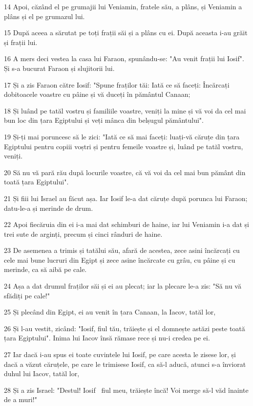 \par 14 Apoi, căzând el pe grumajii lui Veniamin, fratele său, a plâns, și Veniamin a plâns și el pe grumazul lui.
\par 15 După aceea a sărutat pe toți frații săi și a plâns cu ei. După aceasta i-au grăit și frații lui.
\par 16 A mers deci vestea la casa lui Faraon, spunându-se: "Au venit frații lui Iosif". Și s-a bucurat Faraon și slujitorii lui.
\par 17 Și a zis Faraon către Iosif: "Spune fraților tăi: Iată ce să faceți: Încărcați dobitoacele voastre cu pâine și vă duceți în pământul Canaan;
\par 18 Și luând pe tatăl vostru și familiile voastre, veniți la mine și vă voi da cel mai bun loc din țara Egiptului și veți mânca din belșugul pământului".
\par 19 Și-ți mai poruncesc să le zici: "Iată ce să mai faceți: luați-vă căruțe din țara Egiptului pentru copiii voștri și pentru femeile voastre și, luând pe tatăl vostru, veniți.
\par 20 Să nu vă pară rău după locurile voastre, că vă voi da cel mai bun pământ din toată țara Egiptului".
\par 21 Și fiii lui Israel au făcut așa. Iar Iosif le-a dat căruțe după porunca lui Faraon; datu-le-a și merinde de drum.
\par 22 Apoi fiecăruia din ei i-a mai dat schimburi de haine, iar lui Veniamin i-a dat și trei sute de arginți, precum și cinci rânduri de haine.
\par 23 De asemenea a trimis și tatălui său, afară de acestea, zece asini încărcați cu cele mai bune lucruri din Egipt și zece asine încărcate cu grâu, cu pâine și cu merinde, ca să aibă pe cale.
\par 24 Așa a dat drumul fraților săi și ei au plecat; iar la plecare le-a zis: "Să nu vă sfădiți pe cale!"
\par 25 Și plecând din Egipt, ei au venit în țara Canaan, la Iacov, tatăl lor,
\par 26 Și l-au vestit, zicând: "Iosif, fiul tău, trăiește și el domnește astăzi peste toată țara Egiptului". Inima lui Iacov însă rămase rece și nu-i credea pe ei.
\par 27 Iar dacă i-au spus ei toate cuvintele lui Iosif, pe care acesta le zisese lor, și dacă a văzut căruțele, pe care le trimisese Iosif, ca să-l aducă, atunci s-a înviorat duhul lui Iacov, tatăl lor,
\par 28 Și a zis Israel: "Destul! Iosif  fiul meu, trăiește încă! Voi merge să-l văd înainte de a muri!"

